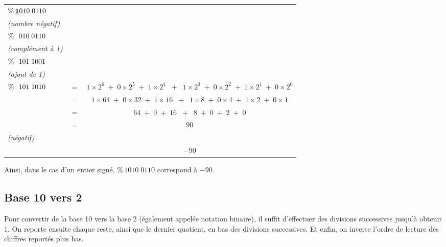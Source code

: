 \documentclass[11pt,a4paper]{article}
\begin{document}
\bigskip

\begin{tabular}{l c c}
$ \% \, \text{\textbf{\underline{1}}}010 \; 0110 $  & & \\
\textit{(nombre négatif)} & & \\
$ \% \, \text{\phantom{1}}010 \; 0110 $  & & \\
\textit{(complément à 1)} & & \\
$ \% \, \text{\phantom{1}}101 \; 1001 $  & & \\
\textit{(ajout de 1)} & & \\
$ \% \, \text{\phantom{1}}101 \; 1010 $  &  $ = $  &  $ 1 \times 2^6 \; + \; 0 \times 2^5 \; + \; 1 \times 2^4  \; \; + \; \; 1 \times 2^3 \; + \; 0 \times 2^2 \; + \; 1 \times 2^1 \; + \; 0 \times 2^0 $ \\
  &  $ = $  &  $ 1 \times 64 \; + \; 0 \times 32 \; + \; 1 \times 16  \; \; + \; \; 1 \times 8 \; + \; 0 \times 4 \; + \; 1 \times 2 \; + \; 0 \times 1 $ \\
  &  $ = $  &  $ 64 \; + \; 0 \; + \; 16 \; \; + \; \; 8 \; + \; 0 \; + \; 2 \; + \; 0 $ \\
  &  $ = $  &  $ 90 $ \\
\textit{(négatif)} & & \\
  &         &  $ - 90 $ \\
\end{tabular}

\bigskip

Ainsi, dans le cas d'un entier signé, $ \% \, 1010 \; 0110 $ correspond à $ -90 $.

\bigskip


\subsection{Base 10 vers 2}

Pour convertir de la base 10 vers la base 2 (également appelée notation binaire), il suffit d'effectuer des divisions successives jusqu'à obtenir $ 1 $.
On reporte ensuite chaque reste, ainsi que le dernier quotient, en bas des divisions successives.
Et enfin, on inverse l'ordre de lecture des chiffres reportés plus bas.

\medskip
\end{document}
